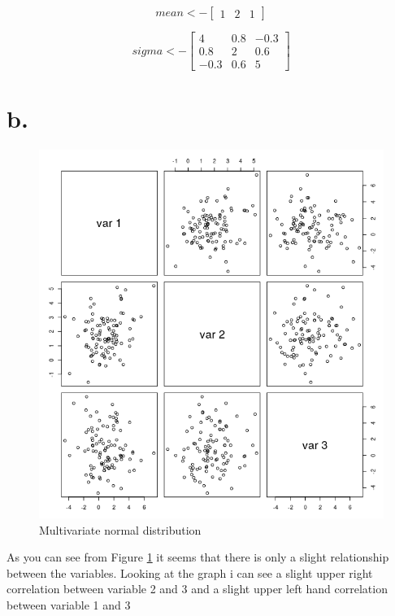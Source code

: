 \documentclass{report}
\begin{document}
\[
  mean <-
  \begin{bmatrix}
    1 & 2 & 1
  \end{bmatrix}
\]

\[
  sigma <-
  \begin{bmatrix}
    4 & 0.8 & -0.3 \\
    0.8 & 2 & 0.6 \\
    -0.3 & 0.6 & 5
  \end{bmatrix}
\]

\section{b.}

\begin{figure}[H]
  \includegraphics[width=\linewidth]{mvnd_scatter_plot.png}
  \caption{Multivariate normal distribution}
  \label{fig:MND}
\end{figure}

\par
As you can see from Figure \ref{fig:MND} it seems that there is only a slight relationship between the variables. Looking at the graph i can see a slight upper right correlation between variable 2 and 3 and a slight upper left hand correlation between variable 1 and 3
\end{document}
